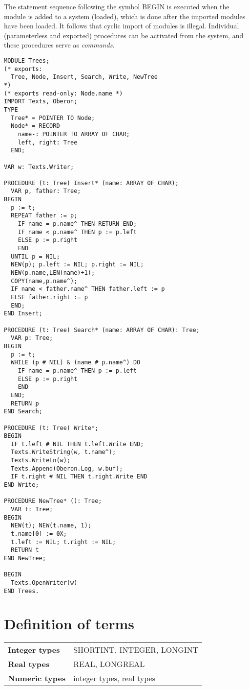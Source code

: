 The statement sequence following the symbol BEGIN is
executed when the module is added to a system (loaded), which is done
after the imported modules have been loaded. It follows that cyclic
import of modules is illegal. Individual (parameterless and exported)
procedures can be activated from the system, and these procedures
serve as {\em commands}.
{\small
\begin{verbatim}
MODULE Trees;
(* exports:
  Tree, Node, Insert, Search, Write, NewTree
*)
(* exports read-only: Node.name *)
IMPORT Texts, Oberon;
TYPE
  Tree* = POINTER TO Node;
  Node* = RECORD
    name-: POINTER TO ARRAY OF CHAR;
    left, right: Tree
  END;

VAR w: Texts.Writer;

PROCEDURE (t: Tree) Insert* (name: ARRAY OF CHAR);
  VAR p, father: Tree;
BEGIN
  p := t;
  REPEAT father := p;
    IF name = p.name^ THEN RETURN END;
    IF name < p.name^ THEN p := p.left
    ELSE p := p.right
    END
  UNTIL p = NIL;
  NEW(p); p.left := NIL; p.right := NIL;
  NEW(p.name,LEN(name)+1);
  COPY(name,p.name^);
  IF name < father.name^ THEN father.left := p
  ELSE father.right := p
  END;
END Insert;

PROCEDURE (t: Tree) Search* (name: ARRAY OF CHAR): Tree;
  VAR p: Tree;
BEGIN
  p := t;
  WHILE (p # NIL) & (name # p.name^) DO
    IF name = p.name^ THEN p := p.left
    ELSE p := p.right
    END
  END;
  RETURN p
END Search;

PROCEDURE (t: Tree) Write*;
BEGIN
  IF t.left # NIL THEN t.left.Write END;
  Texts.WriteString(w, t.name^);
  Texts.WriteLn(w);
  Texts.Append(Oberon.Log, w.buf);
  IF t.right # NIL THEN t.right.Write END
END Write;

PROCEDURE NewTree* (): Tree;
  VAR t: Tree;
BEGIN
  NEW(t); NEW(t.name, 1);
  t.name[0] := 0X;
  t.left := NIL; t.right := NIL;
  RETURN t
END NewTree;

BEGIN
  Texts.OpenWriter(w)
END Trees.
\end{verbatim}
}

\section{Definition of terms}\label{o2r:terms}

\begin{tabular}{ll}
{\bf Integer types}  &       SHORTINT, INTEGER, LONGINT \\
{\bf Real types}     &       REAL, LONGREAL \\
{\bf Numeric types}  &       integer types, real types \\
\end{tabular}

